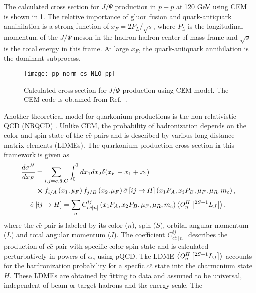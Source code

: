\documentclass[../main.tex]{subfiles}
\begin{document}
The calculated cross section for $J/\Psi$ production in $p+p$ at 120 GeV using
CEM is shown in \cref{fig:cem_cs}. The relative importance of gluon fusion
and quark-antiquark annihilation is a strong function of $x_F=2P_L/\sqrt{s}$,
where $P_L$ is the longitudinal momentum of the $J/\Psi$ meson in the
hadron-hadron center-of-mass frame and $\sqrt{s}$ is the total energy in this
frame. At large $x_F$, the quark-antiquark annihilation is the dominant subprocess.
\begin{figure}[h!]
	\centering
	\texttt{[image: pp\_norm\_cs\_NLO\_pp]}
	\caption{Calculated cross section for $J/\Psi$ production using CEM model.
		The CEM code is obtained from Ref.~\cite{mangano1993}.}
	\label{fig:cem_cs}
\end{figure}

Another theoretical model for quarkonium productions is the non-relativistic
QCD (NRQCD) \cite{bodwin1995,bodwin1997}. Unlike CEM, the probability of
hadronization depends on the color and spin state of the $c\bar{c}$ pairs and
is described by various long-distance matrix elements (LDMEs). The quarkonium
production cross section in this framework is given as
\begin{equation}
	\begin{split}
		\frac{d\sigma^H}{dx_F} &=\sum_{i,j = q,\bar{q},G}\int^1_0 dx_1 dx_2 \delta(x_F-x_1+x_2)\\
		&\cross f_{i/A}\left(x_1,\mu_F\right)f_{j/B}\left(x_2,\mu_F\right)\hat{\sigma}\left[ij\rightarrow H\right]\left(x_1P_A,x_2P_B,\mu_F,\mu_R , m_c\right),
	\end{split}
\end{equation}
\begin{equation}
	\hat{\sigma}\left[ij\rightarrow H\right]= \sum_n C^{ij}_{c\bar{c}\left[n\right]}\left(x_1P_A,x_2P_B,\mu_F,\mu_R , m_c\right)\expval{O^H_n \left[^{2S+1}L_J\right]},
\end{equation}
where the $c\bar{c}$ pair is labeled by its color ($n$), spin ($S$), orbital
angular momentum ($L$) and total angular momentum ($J$). The coefficient
$C^{ij}_{c\bar{c}\left[n\right]}$ describes the production of $c\bar{c}$ pair
with specific color-spin state and is calculated perturbatively in powers of
$\alpha_s$ using pQCD. The LDME $\expval{O^H_n \left[^{2S+1}L_J\right]}$ accounts
for the hardronization probability for a specfic $c\bar{c}$ state into the
charmonium state $H$. These LDMEs are obtained by fitting to data and assumed to
be universal, independent of beam or target hadrons and the energy scale. The
\end{document}
